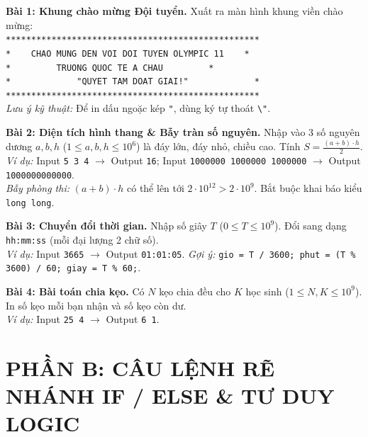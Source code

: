 \documentclass[11pt,a4paper]{article}
\begin{document}
\textbf{\color{AsianBlue}Bài 1: Khung chào mừng Đội tuyển.} Xuất ra màn hình khung viền chào mừng:\\
\texttt{**************************************************}\\
\texttt{* \ \ \ CHAO MUNG DEN VOI DOI TUYEN OLYMPIC 11 \ \ \ *}\\
\texttt{* \ \ \ \ \ \ \ \ TRUONG QUOC TE A CHAU \ \ \ \ \ \ \ \ *}\\
\texttt{* \ \ \ \ \ \ \ \ \ \ \ \ "QUYET TAM DOAT GIAI!" \ \ \ \ \ \ \ \ \ \ \ \ *}\\
\texttt{**************************************************}\\
\textit{Lưu ý kỹ thuật:} Để in dấu ngoặc kép \texttt{"}, dùng ký tự thoát \texttt{\textbackslash"}.

\vspace{0.1cm}
\noindent
\textbf{\color{AsianBlue}Bài 2: Diện tích hình thang \& Bẫy tràn số nguyên.} Nhập vào 3 số nguyên dương $a, b, h$ ($1 \le a, b, h \le 10^6$) là đáy lớn, đáy nhỏ, chiều cao. Tính $S = \frac{(a + b) \cdot h}{2}$.\\
\textit{Ví dụ:} Input \texttt{5 3 4} $\to$ Output \texttt{16}; Input \texttt{1000000 1000000 1000000} $\to$ Output \texttt{1000000000000}.\\
\textit{Bẫy phòng thi:} $(a + b) \cdot h$ có thể lên tới $2 \cdot 10^{12} > 2 \cdot 10^9$. Bắt buộc khai báo kiểu \texttt{long long}.

\vspace{0.1cm}
\noindent
\textbf{\color{AsianBlue}Bài 3: Chuyển đổi thời gian.} Nhập số giây $T$ ($0 \le T \le 10^9$). Đổi sang dạng \texttt{hh:mm:ss} (mỗi đại lượng 2 chữ số).\\
\textit{Ví dụ:} Input \texttt{3665} $\to$ Output \texttt{01:01:05}. \textit{Gợi ý:} \texttt{gio = T / 3600; phut = (T \% 3600) / 60; giay = T \% 60;}.

\vspace{0.1cm}
\noindent
\textbf{\color{AsianBlue}Bài 4: Bài toán chia kẹo.} Có $N$ kẹo chia đều cho $K$ học sinh ($1 \le N, K \le 10^9$). In số kẹo mỗi bạn nhận và số kẹo còn dư.\\
\textit{Ví dụ:} Input \texttt{25 4} $\to$ Output \texttt{6 1}.

\vspace{-0.2cm}
\section*{\color{AsianDarkBlue}\small PHẦN B: CÂU LỆNH RẼ NHÁNH IF / ELSE \& TƯ DUY LOGIC}
\vspace{-0.2cm}
\end{document}
